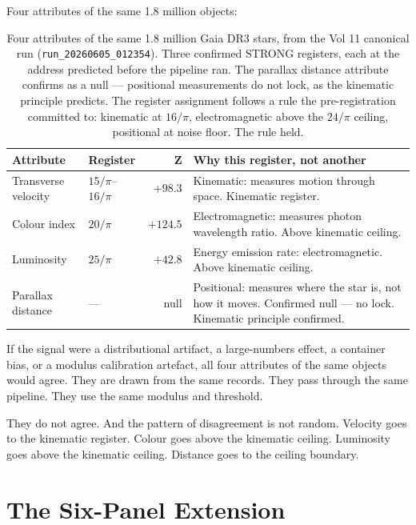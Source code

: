 \documentclass[11pt, letterpaper, openany]{book}
\begin{document}
Four attributes of the same 1.8 million objects:

\begin{table}[H]
\centering
\renewcommand{\arraystretch}{1.5}
\small
\begin{tabular}{|l|l|r|p{6cm}|}
\hline
\rowcolor{kishblue!10}
\textbf{Attribute} & \textbf{Register} & \textbf{Z} &
\textbf{Why this register, not another} \\
\hline\hline
Transverse velocity & $15/\pi$--$16/\pi$ & $+98.3$ &
Kinematic: measures motion through space. Kinematic register. \\
Colour index & $20/\pi$ & $+124.5$ &
Electromagnetic: measures photon wavelength ratio. Above kinematic ceiling. \\
Luminosity & $25/\pi$ & $+42.8$ &
Energy emission rate: electromagnetic. Above kinematic ceiling. \\
Parallax distance & --- & null &
Positional: measures where the star is, not how it moves.
Confirmed null --- no lock. Kinematic principle confirmed. \\
\hline
\end{tabular}
\caption{Four attributes of the same 1.8 million Gaia DR3 stars, from
the Vol 11 canonical run (\texttt{run\_20260605\_012354}). Three
confirmed STRONG registers, each at the address predicted before the
pipeline ran. The parallax distance attribute confirms as a null ---
positional measurements do not lock, as the kinematic principle predicts.
The register assignment follows a rule the pre-registration committed to:
kinematic at $16/\pi$, electromagnetic above the $24/\pi$ ceiling,
positional at noise floor. The rule held.}
\end{table}

If the signal were a distributional artifact, a large-numbers effect,
a container bias, or a modulus calibration artefact, all four
attributes of the same objects would agree. They are drawn from the
same records. They pass through the same pipeline. They use the same
modulus and threshold.

They do not agree. And the pattern of disagreement is not random.
Velocity goes to the kinematic register. Colour goes above the
kinematic ceiling. Luminosity goes above the kinematic ceiling.
Distance goes to the ceiling boundary.

\section{The Six-Panel Extension}
\end{document}
